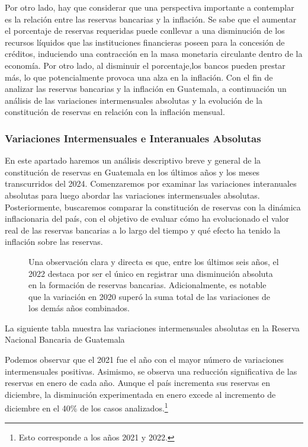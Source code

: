Por otro lado, hay que considerar que una perspectiva importante a contemplar es la relación entre las reservas bancarias y la inflación. Se sabe que el aumentar el porcentaje de reservas requeridas puede conllevar a una disminución de los recursos líquidos que las instituciones financieras poseen para la concesión de créditos, induciendo una contracción en la masa monetaria circulante dentro de la economía. Por otro lado, al disminuir el porcentaje,los bancos pueden prestar más, lo que potencialmente provoca una alza en la inflación. Con el fin de analizar las reservas bancarias y la inflación en Guatemala, a continuación un análisis de las variaciones intermensuales absolutas y la evolución de la constitución de reservas en relación con la inflación mensual. 


\subsubsection{Variaciones Intermensuales e Interanuales Absolutas}
En este apartado haremos un análisis descriptivo breve y general de la constitución de reservas en Guatemala en los últimos años y los meses transcurridos del 2024. Comenzaremos por examinar las variaciones interanuales absolutas para luego abordar las variaciones intermensuales absolutas. Posteriormente, buscaremos comparar la constitución de reservas con la dinámica inflacionaria del país, con el objetivo de evaluar cómo ha evolucionado el valor real de las reservas bancarias a lo largo del tiempo y qué efecto ha tenido la inflación sobre las reservas.
\newpage
\begin{figure}[ht!]
    \begin{minipage}{0.5\textwidth}
        \centering
        
    \end{minipage}%
    \begin{minipage}{0.5\textwidth}
        Una observación clara y directa es que, entre los últimos seis años, el 2022 destaca por ser el único en registrar una disminución absoluta en la formación de reservas bancarias. Adicionalmente, es notable que la variación en 2020 superó la suma total de las variaciones de los demás años combinados.
    \end{minipage}
\end{figure}
La siguiente tabla muestra las variaciones intermensuales absolutas en la Reserva Nacional Bancaria de Guatemala
 
Podemos observar que el 2021 fue el año con el mayor número de variaciones intermensuales positivas. Asimismo, se observa una reducción significativa de las reservas en enero de cada año. Aunque el país incrementa sus reservas en diciembre, la disminución experimentada en enero excede al incremento de diciembre en el 40\% de los casos analizados.\footnote{Esto corresponde a los años 2021 y 2022.} \\


